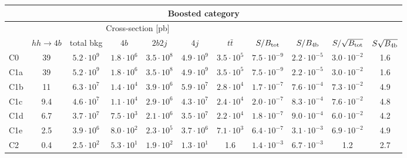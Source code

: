 \begin{tabular}{|l|cc|cccc|cccc|}
  \hline
\multicolumn{11}{|c|}{Boosted category}\\
\hline
&  \multicolumn{6}{c|}{Cross-section [pb]} &  &  & &  \\
   &  $hh\to 4b$ &  total bkg  &   $4b$    &  $2b2j$   &   $4j$    &
$t\bar{t}$ &
$S/B_{\rm tot}$ & $S/B_{\rm 4b}$ & $S/\sqrt{B_{\rm tot}}$ & $S\sqrt{B_{\rm 4b}}$ \\
  \hline
  \hline
C0      & 39  &   $5.2\cdot 10^9$   & $1.8\cdot 10^6$ & $3.5\cdot 10^8$ & $4.9\cdot 10^9$ & $3.5\cdot 10^5$  &   $7.5\cdot 10^{-9}$   & $2.2\cdot 10^{-5}$  &  $ 3.0\cdot 10^{-2}$   & 1.6 \\
 C1a     & 39  &   $5.2\cdot 10^9$   & $1.8\cdot 10^6$ & $3.5\cdot 10^8$ & $4.9\cdot 10^9$ & $3.5\cdot 10^5$  &   $7.5\cdot 10^{-9}$   & $2.2\cdot 10^{-5}$ &  $ 3.0\cdot 10^{-2}$   & 1.6  \\
 C1b     & 11  &   $6.3\cdot 10^7$   & $1.4\cdot 10^4$ & $3.9\cdot 10^6$ & $5.9\cdot 10^7$ & $2.8\cdot 10^4$  &   $1.7\cdot 10^{-7}$   & $7.6\cdot 10^{-4}$  & $  7.3\cdot 10^{-2}$   & 4.9  \\
 C1c     & 9.4  &   $4.6\cdot 10^7$   & $1.1\cdot 10^4$ & $2.9\cdot 10^6$ & $4.3\cdot 10^7$ & $2.4\cdot 10^4$ &   $2.0\cdot 10^{-7}$   & $8.3\cdot 10^{-4}$ &  $ 7.6\cdot 10^{-2}$   & 4.8 \\
 C1d     & 6.7  &   $3.7\cdot 10^7$   & $7.5\cdot 10^3$ & $2.1\cdot 10^6$ & $3.5\cdot 10^7$ & $2.2\cdot 10^4$ &   $1.8\cdot 10^{-7}$   & $9.0\cdot 10^{-4}$ &  $ 6.0\cdot 10^{-2}$   & 4.2  \\
 C1e     & 2.5  &   $3.9\cdot 10^6$   & $8.0\cdot 10^2$ & $2.3\cdot 10^5$ & $3.7\cdot 10^6$ & $7.1\cdot 10^3$   &   $6.4\cdot 10^{-7}$   & $3.1\cdot 10^{-3}$ &  $ 6.9\cdot 10^{-2}$   & 4.9\\
 C2      & 0.4  &   $2.5\cdot 10^2$   & $5.3\cdot 10^1$ & $1.9\cdot 10^2$ & $1.3\cdot 10^1$ & 1.6  &   $1.4\cdot 10^{-3}$   & $6.7\cdot 10^{-3}$ &   1.2   & 2.7  \\
\hline
\end{tabular}
